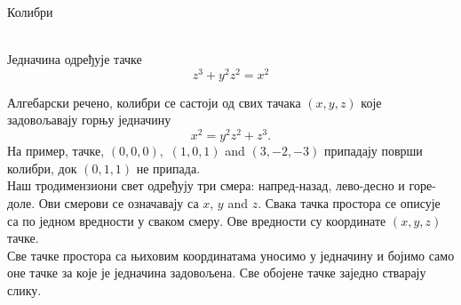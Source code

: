 \documentclass[sr]{./../../common/SurferDesc}%
\begin{document}
\footnotesize

\begin{surferPage}
  \begin{surferTitle}Колибри\end{surferTitle}   \\
Једначина одређује тачке\\
  
  \smallskip
\[z^3+ y^2	z^2	= x^2\]

\singlespacing
Алгебарски речено, колибри се састоји од свих тачака  $(x, y, z)$ које задовољавају горњу једначину
\smallskip
\[ x^2= y^2z^2+z^3.\]
\smallskip
На пример, тачке, $(0,0,0),$ $(1,0,1)$ and $(3,-2,-3)$ припадају површи колибри, док $(0,1,1)$ не припада.\\
 \singlespacing
 Наш тродимензиони свет одређују три смера: напред-назад, лево-десно и горе-доле. Ови смерови се означавају са $x$, $y$ and $z$. Свака тачка простора се описује са по једном вредности у сваком смеру. Ове вредности су координате $(x,y,z)$ тачке.\\
\singlespacing
Све тачке простора са њиховим координатама  уносимо у једначину и бојимо само оне тачке за које је једначина задовољена. Све обојене тачке заједно стварају слику.\\
\singlespacing


  \begin{surferText}
     \end{surferText}
\end{surferPage}
\end{document}

